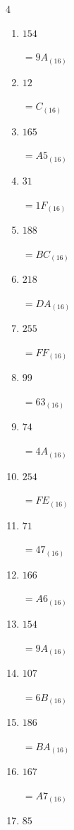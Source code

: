 \begin{multicols}{4}
\begin{enumerate}
  \item $154$

        $=9A_{(16)}$

  \item $12$

        $=C_{(16)}$

\columnbreak %

  \item $165$

        $=A5_{(16)}$

  \item $31$

        $=1F_{(16)}$

  \item $188$

        $=BC_{(16)}$

  \item $218$

        $=DA_{(16)}$

  \item $255$

        $=FF_{(16)}$

  \item $99$

        $=63_{(16)}$

  \item $74$

        $=4A_{(16)}$

  \item $254$

        $=FE_{(16)}$

  \item $71$

        $=47_{(16)}$

  \item $166$

        $=A6_{(16)}$

  \item $154$

        $=9A_{(16)}$

  \item $107$

        $=6B_{(16)}$

  \item $186$

        $=BA_{(16)}$

  \item $167$

        $=A7_{(16)}$

  \item $85$


\end{enumerate}
\end{multicols}
